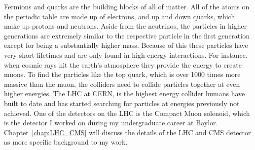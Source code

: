 Fermions and quarks are the building blocks of all of matter. All of the atoms on the periodic table are made up of electrons, and up and down quarks, which make up protons and neutrons. Aside from the neutrinos, the particles in higher generations are extremely similar to the respective particle in the first generation except for being a substantially higher mass. Because of this these particles have very short lifetimes and are only found in high energy interactions. For instance, when cosmic rays hit the earth's atmosphere they provide the energy to create muons. To find the particles like the top quark, which is over 1000 times more massive than the muon, the colliders need to collide particles together at even higher energies. The LHC at CERN, is the highest energy collider humans have built to date and has started searching for particles at energies previously not achieved. One of the detectors on the LHC is the Compact Muon solenoid, which is the detector I worked on during my undergraduate career at Baylor. Chapter~\ref{chap:LHC_CMS} will discuss the details of the LHC and CMS detector as more specific background to my work. 
